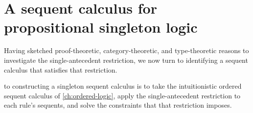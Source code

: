\section{A sequent calculus for propositional singleton logic}\label{sec:singleton-logic:seq-calc}

Having sketched proof-theoretic, category-theoretic, and type-theoretic reasons to investigate the single-antecedent restriction, we now turn to identifying a sequent calculus that satisfies that restriction.





 to constructing a singleton sequent calculus is to take the intuitionistic ordered sequent calculus of \cref{ch:ordered-logic}, apply the single-antecedent restriction to each rule's sequents, and solve the constraints that that restriction imposes.

